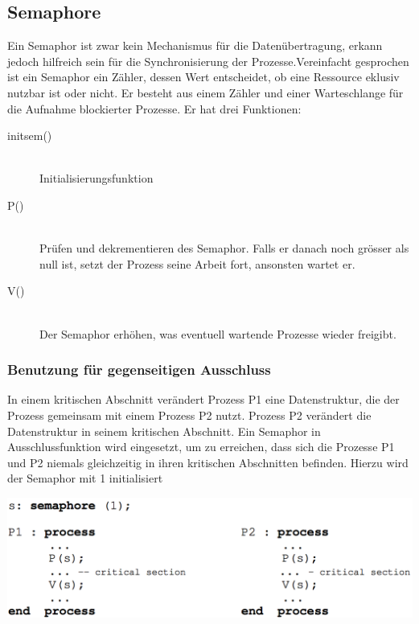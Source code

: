 \documentclass[10pt]{article}
\begin{document}
\newpage
\subsection{Semaphore}
Ein Semaphor ist zwar kein Mechanismus für die Datenübertragung, erkann jedoch hilfreich sein für die Synchronisierung der Prozesse.Vereinfacht gesprochen ist ein Semaphor ein Zähler, dessen Wert entscheidet, ob eine Ressource eklusiv nutzbar ist oder nicht. Er besteht aus einem Zähler und einer Warteschlange für die Aufnahme blockierter Prozesse. Er hat drei Funktionen:
\begin{description}
	\item[initsem()] \hfill \\ Initialisierungsfunktion
	\item[P()] \hfill \\ Prüfen und dekrementieren des Semaphor. Falls er danach noch grösser als null ist, setzt der Prozess seine Arbeit fort, ansonsten wartet er.
	\item[V()] \hfill \\ Der Semaphor erhöhen, was eventuell wartende Prozesse wieder freigibt.
\end{description}

\subsubsection{Benutzung für gegenseitigen Ausschluss}
In einem kritischen Abschnitt verändert Prozess P1 eine Datenstruktur, die der Prozess gemeinsam mit einem Prozess P2 nutzt. Prozess P2 verändert die Datenstruktur in seinem kritischen Abschnitt. Ein Semaphor in Ausschlussfunktion wird eingesetzt, um zu erreichen, dass sich die Prozesse P1 und P2 niemals gleichzeitig in ihren kritischen Abschnitten befinden. Hierzu wird der Semaphor mit 1 initialisiert
\begin{center}
	\includegraphics[scale=0.25]{semaphore-benutzung-ausschluss.png}\\
\end{center}
\end{document}

